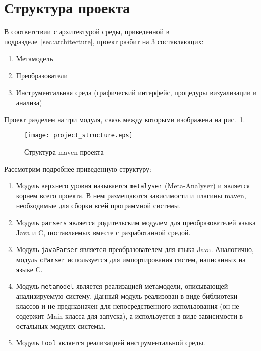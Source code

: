 \section{Структура проекта}

В соответствии с архитектурой среды, приведенной в
подразделе~\ref{sec:architecture}, проект разбит на 3 составляющих:

\begin{enumerate}
    \item Метамодель
    \item Преобразователи
    \item Инструментальная среда (графический интерфейс, процедуры визуализации
    и анализа)
\end{enumerate}


Проект разделен на три модуля, связь между которыми изображена на
рис.~\ref{fig:project_structure}.

\begin{figure}[ht]
    \begin{center}
        \texttt{[image: project\_structure.eps]}
    \end{center}
    \caption{Структура maven-проекта}
    \label{fig:project_structure}
\end{figure}

Рассмотрим подробнее приведенную структуру:

\begin{enumerate}
    \item Модуль верхнего уровня называется \texttt{metalyser} (Meta-Analyser) и
    является корнем всего проекта. В нем размещаются зависимости и плагины maven,
    необходимые для сборки всей программной системы.
    \item Модуль \texttt{parsers} является родительским модулем для
    преобразователей языка Java и C, поставляемых вместе с разработанной средой.
    \item Модуль \texttt{javaParser} является преобразователем для языка Java.
    Аналогично, модуль \texttt{cParser} используется для импортирования систем,
    написанных на языке C.
    \item Модуль \texttt{metamodel} является реализацией метамодели,
    описывающей анализируемую систему. Данный модуль реализован в виде
    библиотеки классов и не предназначен для непосредственного использования
    (он не содержит Main-класса для запуска), а используется в виде зависимости
    в остальных модулях системы.
    \item Модуль \texttt{tool} является реализацией инструментальной среды.
\end{enumerate}

